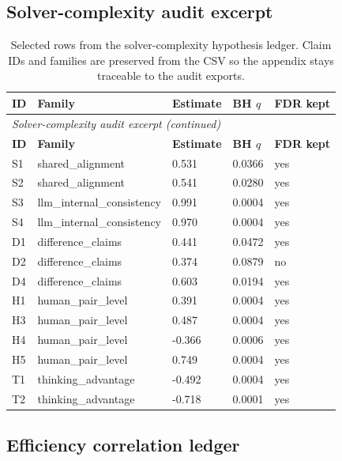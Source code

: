 \subsection{Solver-complexity audit excerpt}

{\scriptsize
\begin{longtable}{p{0.5in}p{1.15in}p{0.85in}p{0.85in}p{0.75in}}
\caption{Selected rows from the solver-complexity hypothesis ledger. Claim IDs and families are preserved from the CSV so the appendix stays traceable to the audit exports.} \\
\toprule
\textbf{ID} & \textbf{Family} & \textbf{Estimate} & \textbf{BH $q$} & \textbf{FDR kept} \\
\midrule
\endfirsthead
\multicolumn{5}{l}{\small\itshape Solver-complexity audit excerpt (continued)} \\
\toprule
\textbf{ID} & \textbf{Family} & \textbf{Estimate} & \textbf{BH $q$} & \textbf{FDR kept} \\
\midrule
\endhead
S1 & shared\_alignment & 0.531 & 0.0366 & yes \\
S2 & shared\_alignment & 0.541 & 0.0280 & yes \\
S3 & llm\_internal\_consistency & 0.991 & 0.0004 & yes \\
S4 & llm\_internal\_consistency & 0.970 & 0.0004 & yes \\
D1 & difference\_claims & 0.441 & 0.0472 & yes \\
D2 & difference\_claims & 0.374 & 0.0879 & no \\
D4 & difference\_claims & 0.603 & 0.0194 & yes \\
H1 & human\_pair\_level & 0.391 & 0.0004 & yes \\
H3 & human\_pair\_level & 0.487 & 0.0004 & yes \\
H4 & human\_pair\_level & -0.366 & 0.0006 & yes \\
H5 & human\_pair\_level & 0.749 & 0.0004 & yes \\
T1 & thinking\_advantage & -0.492 & 0.0004 & yes \\
T2 & thinking\_advantage & -0.718 & 0.0001 & yes \\
\bottomrule
\end{longtable}
}

\subsection{Efficiency correlation ledger}

